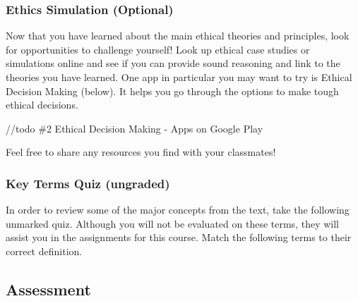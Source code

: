 \documentclass[
]{book}
\begin{document}
\begin{reflect}
\hypertarget{ethics-simulation-optional-1}{%
\subsubsection*{Ethics Simulation (Optional)}\label{ethics-simulation-optional-1}}

Now that you have learned about the main ethical theories and principles, look
for opportunities to challenge yourself! Look up ethical case studies or
simulations online and see if you can provide sound reasoning and link to the
theories you have learned.
One app in particular you may want to try is Ethical Decision Making (below). It helps you go through the options to make tough ethical decisions.

//todo \#2
Ethical Decision Making - Apps on Google Play

Feel free to share any resources you find with your classmates!

\hypertarget{key-terms-quiz-ungraded-3}{%
\subsubsection*{Key Terms Quiz (ungraded)}\label{key-terms-quiz-ungraded-3}}

In order to review some of the major concepts from the text, take the following
unmarked quiz. Although you will not be evaluated on these terms, they will
assist you in the assignments for this course.
Match the following terms to their correct definition.
\end{reflect}

\hypertarget{assessment-3}{%
\subsection*{Assessment}\label{assessment-3}}
\end{document}
